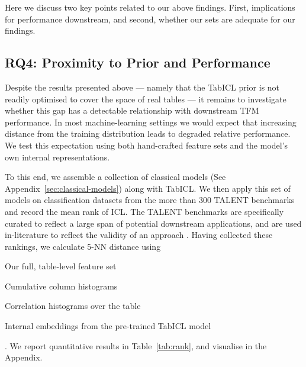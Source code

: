 \documentclass{article}
\begin{document}


Here we discuss two key points related to our above findings.
First, implications for performance downstream, and second, whether our sets are adequate for our findings.

\subsection{RQ4: Proximity to Prior and Performance}
\label{sec:rq4}

Despite the results presented above --- namely that the TabICL prior is not readily optimised to cover the space of real tables --- it remains to investigate whether this gap has a detectable relationship with downstream TFM performance.
In most machine-learning settings we would expect that increasing distance from the training distribution leads to degraded relative performance.
We test this expectation using both hand-crafted feature sets and the model's own internal representations.

To this end, we assemble a collection of classical models (See Appendix~\ref{sec:classical-models}) along with TabICL.
We then apply this set of models on classification datasets from the more than 300 TALENT benchmarks \cite{liuTalentTabularAnalytics2025} and record the mean rank of ICL.
The TALENT benchmarks are specifically curated to reflect a large span of potential downstream applications, and are used in-literature to reflect the validity of an approach \cite{jiangRepresentationLearningTabular2026, quTabICLTabularFoundation2025}.
Having collected these rankings, we calculate 5-NN distance using \begin{enumerate*}[label=(\roman*), font=\textbf]
    \item Our full, table-level feature set
    \item Cumulative column histograms
    \item Correlation histograms over the table
    \item Internal embeddings from the pre-trained TabICL model
\end{enumerate*}.
We report quantitative results in Table~\ref{tab:rank}, and visualise in the Appendix.
\end{document}
